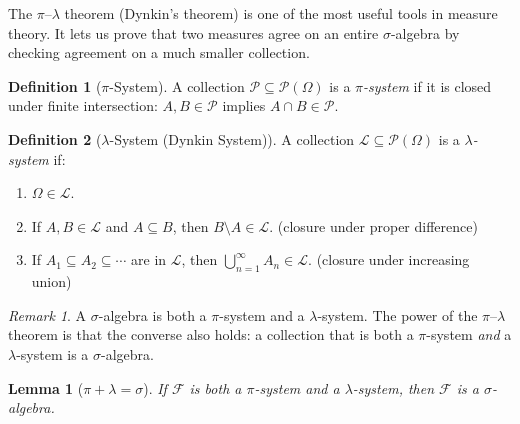 \documentclass[11pt,a4paper]{article}
\theoremstyle{definition}
\newtheorem{definition}{Definition}[section]
\theoremstyle{plain}
\newtheorem{lemma}[theorem]{Lemma}
\theoremstyle{remark}
\newtheorem{remark}{Remark}[section]
\newcommand{\powerset}{\mathcal{P}}
\begin{document}
The $\pi$--$\lambda$ theorem (Dynkin's theorem) is one of the most useful tools
in measure theory. It lets us prove that two measures agree on an entire
$\sigma$-algebra by checking agreement on a much smaller collection.

\begin{definition}[$\pi$-System]
\label{def:pi_system}
A collection $\mathcal{P} \subseteq \powerset(\Omega)$ is a \emph{$\pi$-system}
if it is closed under finite intersection: $A, B \in \mathcal{P}$ implies
$A \cap B \in \mathcal{P}$.
\end{definition}

\begin{definition}[$\lambda$-System (Dynkin System)]
\label{def:lambda_system}
A collection $\mathcal{L} \subseteq \powerset(\Omega)$ is a \emph{$\lambda$-system}
if:
\begin{enumerate}[nosep,label=(\roman*)]
    \item $\Omega \in \mathcal{L}$.
    \item If $A, B \in \mathcal{L}$ and $A \subseteq B$, then $B \setminus A \in \mathcal{L}$.
    \hfill(closure under proper difference)
    \item If $A_1 \subseteq A_2 \subseteq \cdots$ are in $\mathcal{L}$, then
    $\bigcup_{n=1}^\infty A_n \in \mathcal{L}$.
    \hfill(closure under increasing union)
\end{enumerate}
\end{definition}

\begin{remark}
A $\sigma$-algebra is both a $\pi$-system and a $\lambda$-system. The power of the
$\pi$--$\lambda$ theorem is that the converse also holds: a collection that is
both a $\pi$-system \emph{and} a $\lambda$-system is a $\sigma$-algebra.
\end{remark}

\begin{lemma}[$\pi + \lambda = \sigma$]
\label{lem:pi_lambda_sigma}
If $\mathcal{F}$ is both a $\pi$-system and a $\lambda$-system, then $\mathcal{F}$ is a $\sigma$-algebra.
\end{lemma}
\end{document}
